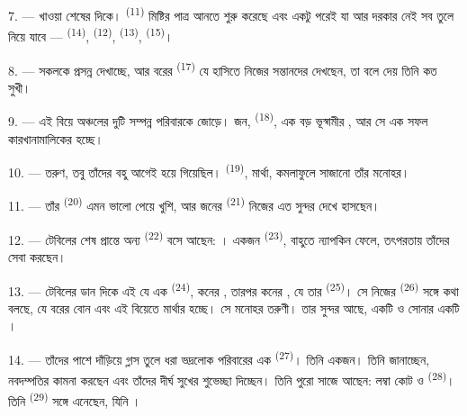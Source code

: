 7. --- খাওয়া শেষের দিকে।  \textsuperscript{(11)} মিষ্টির পাত্র
আনতে শুরু করেছে এবং একটু পরেই যা আর দরকার নেই সব তুলে নিয়ে যাবে ---
 \textsuperscript{(14)},  \textsuperscript{(12)},
 \textsuperscript{(13)}, 
\textsuperscript{(15)}।

\VUsaut{3.0mm}

8. --- সকলকে প্রসন্ন দেখাচ্ছে, আর বরের  \textsuperscript{(17)} যে
হাসিতে নিজের সন্তানদের দেখছেন, তা বলে দেয় তিনি কত সুখী।

9. --- এই বিয়ে অঞ্চলের দুটি সম্পন্ন পরিবারকে জোড়ে। জন, 
\textsuperscript{(18)}, এক বড় ভূস্বামীর , আর সে এক সফল
কারখানামালিকের  হচ্ছে।

10. ---  তরুণ, তবু তাঁদের  বহু আগেই হয়ে
গিয়েছিল।  \textsuperscript{(19)}, মার্থা, কমলাফুলে সাজানো তাঁর
 মনোহর।

11. --- তাঁর  \textsuperscript{(20)} এমন ভালো  পেয়ে
খুশি, আর জনের  \textsuperscript{(21)} নিজের 
এত সুন্দর দেখে হাসছেন।

12. --- টেবিলের শেষ প্রান্তে অন্য  \textsuperscript{(22)} বসে
আছেন: । একজন  \textsuperscript{(23)}, বাহুতে ন্যাপকিন ফেলে, তৎপরতায় তাঁদের সেবা
করছেন।

\VUsaut{3.0mm}

13. --- টেবিলের ডান দিকে এই যে এক  \textsuperscript{(24)}, কনের
, তারপর কনের , যে তার 
\textsuperscript{(25)}। সে নিজের  \textsuperscript{(26)} সঙ্গে কথা
বলছে, যে বরের বোন এবং এই বিয়েতে মার্থার  হচ্ছে। সে মনোহর
তরুণী। তার সুন্দর  আছে, একটি  ও সোনার
একটি ।

14. --- তাঁদের পাশে দাঁড়িয়ে গ্লাস তুলে ধরা ভদ্রলোক পরিবারের এক
 \textsuperscript{(27)}। তিনি  একজন। তিনি
 জানাচ্ছেন, নবদম্পতির  কামনা করছেন এবং
তাঁদের দীর্ঘ সুখের শুভেচ্ছা দিচ্ছেন। তিনি পুরো সাজে আছেন: লম্বা কোট ও
 \textsuperscript{(28)}। তিনি 
\textsuperscript{(29)} সঙ্গে এনেছেন, যিনি ।


